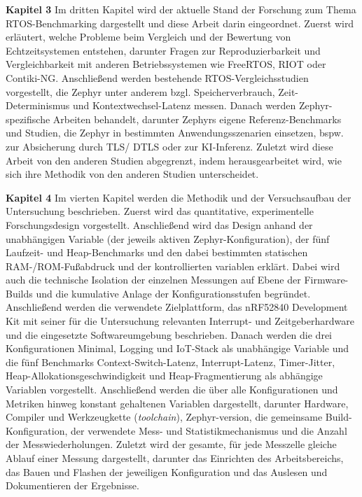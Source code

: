 \textbf{Kapitel 3 }Im dritten Kapitel wird der aktuelle Stand der Forschung zum Thema RTOS-Benchmarking dargestellt und diese Arbeit darin eingeordnet. Zuerst wird erl{\"a}utert, welche Probleme beim Vergleich und der Bewertung von Echtzeitsystemen entstehen, darunter Fragen zur Reproduzierbarkeit und Vergleichbarkeit mit anderen Betriebssystemen wie FreeRTOS, RIOT oder Contiki-NG. Anschlie{\ss}end werden bestehende RTOS-Vergleichsstudien vorgestellt, die Zephyr unter anderem bzgl. Speicherverbrauch, Zeit-Determinismus und Kontextwechsel-Latenz messen. Danach werden Zephyr-spezifische Arbeiten behandelt, darunter Zephyrs eigene Referenz-Benchmarks und Studien, die Zephyr in bestimmten Anwendungsszenarien einsetzen, bspw. zur Absicherung durch TLS/ DTLS oder zur KI-Inferenz. Zuletzt wird diese Arbeit von den anderen Studien abgegrenzt, indem herausgearbeitet wird, wie sich ihre Methodik von den anderen Studien unterscheidet.

\textbf{Kapitel 4 }Im vierten Kapitel werden die Methodik und der Versuchsaufbau der Untersuchung beschrieben. Zuerst wird das quantitative, experimentelle Forschungsdesign vorgestellt. Anschlie{\ss}end wird das Design anhand der unabh{\"a}ngigen Variable (der jeweils aktiven Zephyr-Konfiguration), der f{\"u}nf Laufzeit- und Heap-Benchmarks und den dabei bestimmten statischen RAM-/ROM-Fu{\ss}abdruck und der kontrollierten variablen erkl{\"a}rt. Dabei wird auch die technische Isolation der einzelnen Messungen auf Ebene der Firmware-Builds und die kumulative Anlage der Konfigurationsstufen begr{\"u}ndet. Anschlie{\ss}end werden die verwendete Zielplattform, das nRF52840 Development Kit mit seiner f{\"u}r die Untersuchung relevanten Interrupt- und Zeitgeberhardware und die eingesetzte Softwareumgebung beschrieben. Danach werden die drei Konfigurationen Minimal, Logging und IoT-Stack als unabh{\"a}ngige Variable und die f{\"u}nf Benchmarks Context-Switch-Latenz, Interrupt-Latenz, Timer-Jitter, Heap-Allokationsgeschwindigkeit und Heap-Fragmentierung als abh{\"a}ngige Variablen vorgestellt. Anschlie{\ss}end werden die {\"u}ber alle Konfigurationen und Metriken hinweg konstant gehaltenen Variablen dargestellt, darunter Hardware, Compiler und Werkzeugkette (\emph{toolchain}), Zephyr-version, die gemeinsame Build-Konfiguration, der verwendete Mess- und Statistikmechanismus und die Anzahl der Messwiederholungen. Zuletzt wird der gesamte, f{\"u}r jede Messzelle gleiche Ablauf einer Messung dargestellt, darunter das Einrichten des Arbeitsbereichs, das Bauen und Flashen der jeweiligen Konfiguration und das Auslesen und Dokumentieren der Ergebnisse.


